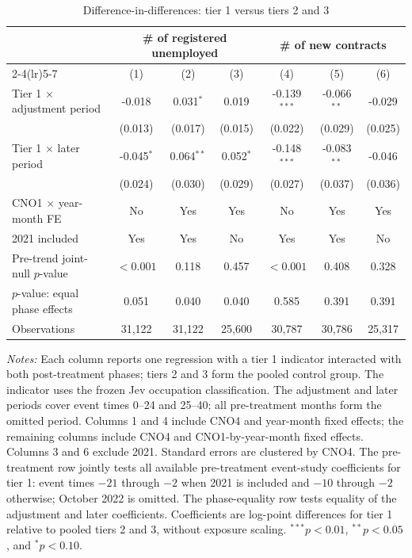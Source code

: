 \begin{table}[!htbp]
\centering
\caption{Difference-in-differences: tier 1 versus tiers 2 and 3}
\label{tab:v1_jev_job_tiers}
\begin{threeparttable}
\scriptsize
\setlength{\tabcolsep}{3.5pt}
\begin{tabular}{lcccccc}
\toprule
& \multicolumn{3}{c}{\# of registered unemployed} & \multicolumn{3}{c}{\# of new contracts} \\
\cmidrule(lr){2-4}\cmidrule(lr){5-7}
& (1) & (2) & (3) & (4) & (5) & (6) \\
\midrule
Tier 1 $\times$ adjustment period & -0.018 & 0.031$^{*}$ & 0.019 & -0.139$^{***}$ & -0.066$^{**}$ & -0.029 \\
 & (0.013) & (0.017) & (0.015) & (0.022) & (0.029) & (0.025) \\
Tier 1 $\times$ later period & -0.045$^{*}$ & 0.064$^{**}$ & 0.052$^{*}$ & -0.148$^{***}$ & -0.083$^{**}$ & -0.046 \\
 & (0.024) & (0.030) & (0.029) & (0.027) & (0.037) & (0.036) \\
\midrule
CNO1 $\times$ year-month FE & No & Yes & Yes & No & Yes & Yes \\
2021 included & Yes & Yes & No & Yes & Yes & No \\
Pre-trend joint-null $p$-value & $<0.001$ & 0.118 & 0.457 & $<0.001$ & 0.408 & 0.328 \\
$p$-value: equal phase effects & 0.051 & 0.040 & 0.040 & 0.585 & 0.391 & 0.391 \\
Observations & 31,122 & 31,122 & 25,600 & 30,787 & 30,786 & 25,317 \\
\bottomrule
\end{tabular}
\begin{tablenotes}[flushleft]
\footnotesize
\item \emph{Notes:} Each column reports one regression with a tier 1 indicator interacted with both post-treatment phases; tiers 2 and 3 form the pooled control group. The indicator uses the frozen Jev occupation classification. The adjustment and later periods cover event times 0--24 and 25--40; all pre-treatment months form the omitted period. Columns 1 and 4 include CNO4 and year-month fixed effects; the remaining columns include CNO4 and CNO1-by-year-month fixed effects. Columns 3 and 6 exclude 2021. Standard errors are clustered by CNO4. The pre-treatment row jointly tests all available pre-treatment event-study coefficients for tier 1: event times $-21$ through $-2$ when 2021 is included and $-10$ through $-2$ otherwise; October 2022 is omitted. The phase-equality row tests equality of the adjustment and later coefficients. Coefficients are log-point differences for tier 1 relative to pooled tiers 2 and 3, without exposure scaling. $^{***}p<0.01$, $^{**}p<0.05$, and $^{*}p<0.10$.
\end{tablenotes}
\end{threeparttable}
\end{table}
